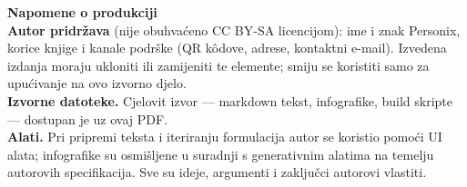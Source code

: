 \clearpage
\thispagestyle{empty}
\begin{flushleft}\small\sffamily
\textbf{Napomene o produkciji}\\[1.2em]

\textbf{Autor pridržava} (nije obuhvaćeno CC BY-SA licencijom): ime i znak
Personix, korice knjige i kanale podrške (QR
kôdove, adrese, kontaktni e-mail). Izvedena izdanja moraju ukloniti ili zamijeniti
te elemente; smiju se koristiti samo za upućivanje na ovo izvorno djelo.\\[1.2em]

\textbf{Izvorne datoteke.} Cjelovit izvor --- markdown tekst, infografike,
build skripte --- dostupan je uz ovaj PDF.\\[1.2em]

\textbf{Alati.} Pri pripremi teksta i iteriranju formulacija autor se
koristio pomoći UI alata; infografike su osmišljene
u suradnji s generativnim alatima na temelju autorovih specifikacija.
Sve su ideje, argumenti i zaključci autorovi vlastiti.
\end{flushleft}
\clearpage
